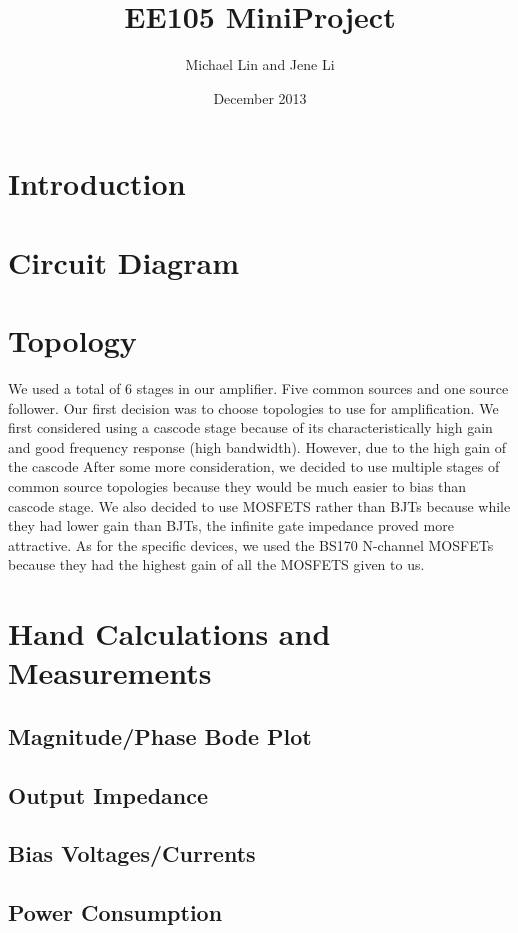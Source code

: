\documentclass{article}
\title{EE105 MiniProject}
\author{Michael Lin and Jene Li}
\date{December 2013}
\begin{document}
\maketitle

\section{Introduction}

\section{Circuit Diagram}

\section{Topology}
We used a total of 6 stages in our amplifier. Five common sources and one source follower.
Our first decision was to choose topologies to use for amplification. We first considered using a cascode stage because of its characteristically high gain and good frequency response (high bandwidth). However, due to the high gain of the cascode  After some more consideration, we decided to use multiple stages of common source topologies because they would be much easier to bias than cascode stage. We also decided to use MOSFETS rather
than BJTs because while they had lower gain than BJTs, the infinite gate impedance proved more attractive. As for the specific devices, we used the 
BS170 N-channel MOSFETs because they had the highest gain of all the MOSFETS given to us. 

\section{Hand Calculations and Measurements}
\subsection*{Magnitude/Phase Bode Plot}
\subsection*{Output Impedance}
\subsection*{Bias Voltages/Currents}
\subsection*{Power Consumption}
\end{document}

